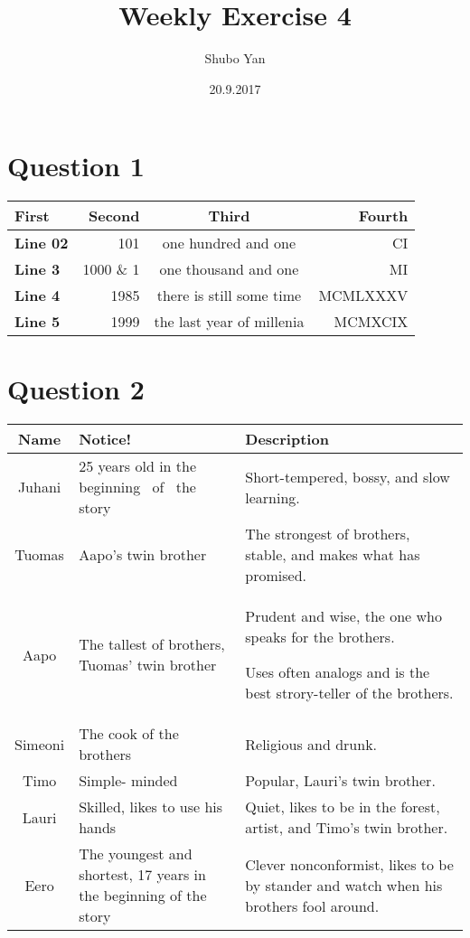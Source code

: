 \documentclass[a4paper,12pt]{article}
\title{ Weekly Exercise 4}
\author{Shubo Yan }
\date{20.9.2017}
\begin{document}
\maketitle
\newpage
\section{Question 1}

\begin{tabular}{|l||r|c|r|}		
\hline
\textbf{First}&\textbf{Second}&\textbf{Third}&\textbf{Fourth}\\
\hline \hline
\textbf{Line 02}&101     &one hundred and one&CI\\
\textbf{Line 3}&1000 \& 1&one thousand and one&MI\\
\textbf{Line 4}&1985     &there is still some time&MCMLXXXV\\
\textbf{Line 5}&1999     &the last year of millenia&MCMXCIX\\
\hline
\end{tabular}
\pagebreak

\section{Question 2}

\begin{tabular}{c| p{25mm}@{\qquad}p{70mm}}

Name&Notice!&Description\\ \hline
Juhani&25 years old in the beginning  \ of \  the story&Short-tempered, bossy, and slow learning.
\\ \hline	
Tuomas&Aapo's twin brother&The strongest of brothers, stable, and makes what has promised.\\ \hline
Aapo&The tallest of brothers, Tuomas' twin brother&Prudent and wise, the one who speaks for the brothers.

Uses often analogs and is the best strory-teller of the brothers.\\ \hline
Simeoni&The cook of the brothers&Religious and drunk.\\ \hline
Timo&Simple- minded&Popular, Lauri's twin brother.\\ \hline
Lauri&Skilled, likes to use his hands&Quiet, likes to be in the forest, artist, and Timo's twin brother.\\ \hline
Eero&The youngest and shortest, 17 years in the beginning of the story&
Clever nonconformist, likes to be by\- stander and watch when his brothers fool around.\\
\end{tabular}
\pagebreak
\end{document}

